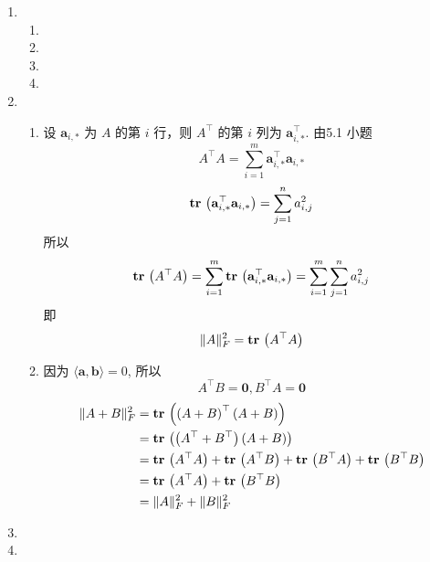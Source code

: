 \documentclass[11pt,letter,notitlepage]{article}
\DeclareMathOperator*{\tr}{\bf tr\,}
\begin{document}
\begin{solution}
    \begin{enumerate}
        \item \begin{enumerate}
                  \item 
                  \item 
                  \item 
                  \item 
              \end{enumerate}
        \item \begin{enumerate}
                  \item  设 $\mathbf{a}_{i,*}$ 为 $A$ 的第 $i$ 行，则 $A^\top$ 的第 $i$ 列为 $\mathbf{a}_{i,*}^\top$.
                        由5.1 小题
                        $$A^\top A=\sum_{i=1}^{m}\mathbf{a}_{i,*}^\top \mathbf{a}_{i,*}$$
                        $$\tr \left( \mathbf{a}_{i,*}^\top \mathbf{a}_{i,*} \right)=\sum_{j=1}^{n} a_{i,j}^2$$
                        所以 $$\tr \left( A^\top A \right)=\sum_{i=1}^{m} \tr \left( \mathbf{a}_{i,*}^\top \mathbf{a}_{i,*} \right)=\sum_{i=1}^{m} \sum_{j=1}^{n} a_{i,j}^2$$
                        即
                        $$\|A\|_F^2=\tr \left(A^\top A \right)$$
                  \item 因为 $\langle \mathbf{a},\mathbf{b} \rangle=0$, 所以
                        $$A^\top B=\mathbf{0}, B^\top A=\mathbf{0}$$
                        $$\begin{aligned}
                                \|A+B\|_F^2
                                 & = \tr \left( \left(A+B\right)^\top \left(A+B\right) \right)                                                              \\
                                 & = \tr \left( \left(A^\top+B^\top\right) \left(A+B\right) \right)                                                         \\
                                 & = \tr \left( A^\top A \right) + \tr \left( A^\top B \right) + \tr \left( B^\top A \right)  + \tr \left( B^\top B \right) \\
                                 & =\tr \left( A^\top A \right) + \tr \left( B^\top B \right)                                                               \\
                                 & = \|A\|_F^2 +\|B\|_F^2
                            \end{aligned}$$
              \end{enumerate}
        \item
        \item
    \end{enumerate}
\end{solution}
\end{document}

